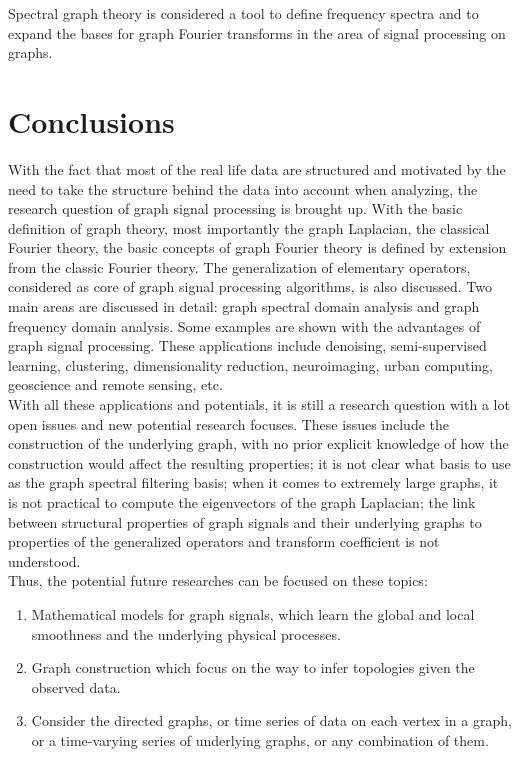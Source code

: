 \documentclass[conference]{IEEEtran}
\begin{document}
Spectral graph theory is considered a tool to define frequency spectra and to expand the bases for graph Fourier transforms in the area of signal processing on graphs. 

\section{Conclusions}  
With the fact that most of the real life data are structured and motivated by the need to take the structure behind the data into account when analyzing, the research question of graph signal processing is brought up. With the basic definition of graph theory, most importantly the graph Laplacian, the classical Fourier theory, the basic concepts of graph Fourier theory is defined by extension from the classic Fourier theory. The generalization of elementary operators, considered as core of graph signal processing algorithms, is also discussed. Two main areas are discussed in detail: graph spectral domain analysis and graph frequency domain analysis. Some examples are shown with the advantages of graph signal processing. These applications include denoising, semi-supervised learning, clustering, dimensionality reduction, neuroimaging, urban computing, geoscience and remote sensing, etc.\\
With all these applications and potentials, it is still a research question with a lot open issues and new potential research focuses. These issues include the construction of the underlying graph, with no prior explicit knowledge of how the construction would affect the resulting properties; it is not clear what basis to use as the graph spectral filtering basis; when it comes to extremely large graphs, it is not practical to compute the eigenvectors of the graph Laplacian; the link between structural properties of graph signals and their underlying graphs to properties of the generalized operators and transform coefficient is not understood.\\
Thus, the potential future researches can be focused on these topics: 
\begin{enumerate}
\item Mathematical models for graph signals, which learn the global and local smoothness and the underlying physical processes.
\item Graph construction which focus on the way to infer topologies given the observed data.
\item Consider the directed graphs, or time series of data on each vertex in a graph, or a time-varying series of underlying graphs, or any combination of them.
\end{enumerate}
\end{document}
